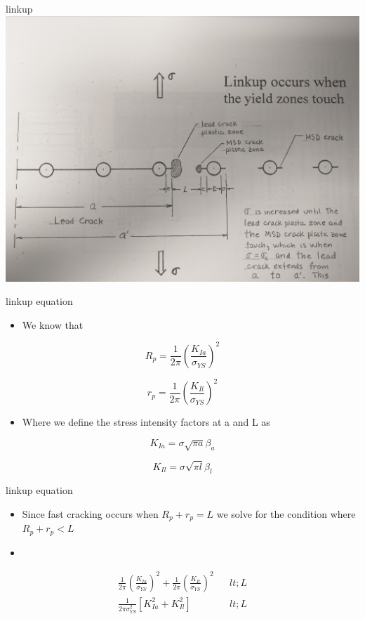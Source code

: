 \documentclass[
  letterpaper,
  ignorenonframetext,
  aspectratio=43,
  handout,
  12pt]{beamer}
\providecommand{\tightlist}{%
  \setlength{\itemsep}{0pt}\setlength{\parskip}{0pt}}
\providecommand{\tightlist}{%
\setlength{\itemsep}{0pt}\setlength{\parskip}{0pt}}
\let\Oldincludegraphics\includegraphics
\renewcommand{\includegraphics}[2][]{\Oldincludegraphics[width=\textwidth,height=0.7\textheight,keepaspectratio]{#2}}
\begin{document}
\begin{frame}{linkup}
\protect\hypertarget{linkup}{}
\includegraphics{../images/msd.jpg}
\end{frame}

\begin{frame}{linkup equation}
\protect\hypertarget{linkup-equation}{}
\begin{itemize}
\tightlist
\item
  We know that
\end{itemize}

\[R_p = \frac{1}{2\pi}\left(\frac{K_{Ia}}{\sigma_{YS}}\right)^2\]

\[r_p = \frac{1}{2\pi}\left(\frac{K_{Il}}{\sigma_{YS}}\right)^2\]

\begin{itemize}
\tightlist
\item
  Where we define the stress intensity factors at a and L as
\end{itemize}

\[K_{Ia} = \sigma \sqrt{\pi a} \beta_a\]

\[K_{Il} = \sigma \sqrt{\pi l} \beta_l\]
\end{frame}

\begin{frame}{linkup equation}
\protect\hypertarget{linkup-equation-1}{}
\begin{itemize}
\tightlist
\item
  Since fast cracking occurs when \(R_p + r_p = L\) we solve for the
  condition where \(R_p + r_p < L\)
\item
\end{itemize}

\[\begin{aligned}
  \frac{1}{2\pi}\left(\frac{K_{Ia}}{\sigma_{YS}}\right)^2 + \frac{1}{2\pi}\left(\frac{K_{Il}}{\sigma_{YS}}\right)^2 &&lt; L\\
  \frac{1}{2\pi\sigma_{YS}^2} \left[K_{Ia}^2 + K_{Il}^2\right] &&lt; L
\end{aligned}\]
\end{frame}
\end{document}
